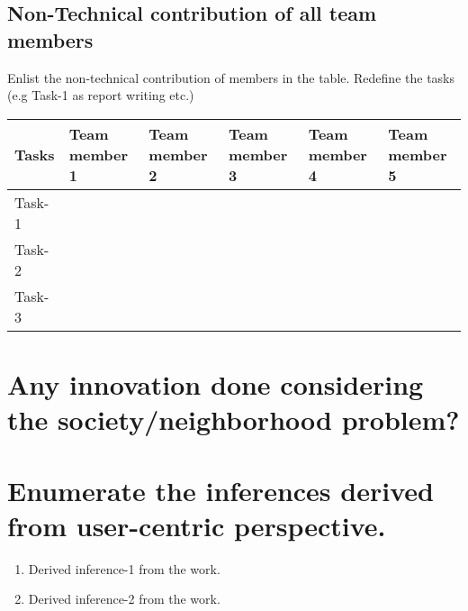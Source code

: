 \documentclass{article}
\begin{document}
\subsection{Non-Technical contribution of all team members }
Enlist the non-technical contribution of members in the table. Redefine the tasks (e.g Task-1 as report writing etc.)
\begin{table}[h]
\centering
\begin{tabular}{|l|l|l|l|l|l|}
\hline
Tasks  & Team member 1 & Team member 2 & Team member 3 & Team member 4 & Team member 5 \\ \hline
Task-1 &               &               &               &               &               \\ \hline
Task-2 &               &               &               &               &               \\ \hline
Task-3 &               &               &               &               &               \\ \hline
\end{tabular}
\end{table}

\section{Any innovation done considering the society/neighborhood problem?}

\section{Enumerate the inferences derived from user-centric perspective.}
	
\begin{enumerate}
\item Derived inference-1 from the work. 
\item Derived inference-2 from the work. 
\end{enumerate} 
\end{document}

